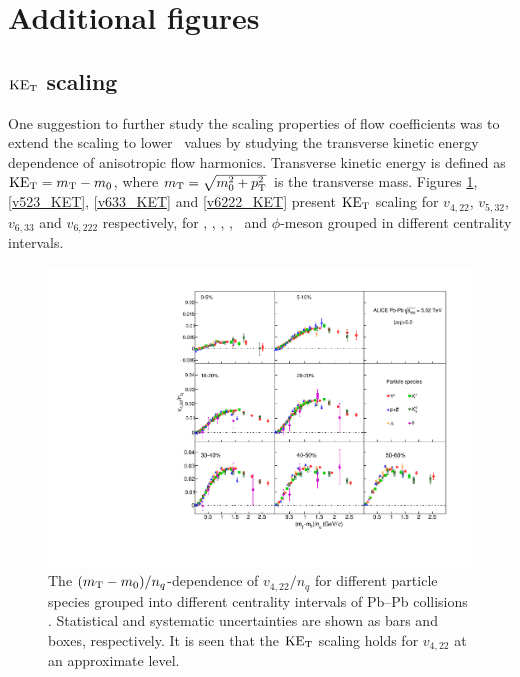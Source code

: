 \section{Additional figures}

\subsection{$\rm{KE_{T}}$ scaling}
\label{Subsubsection:KETscaling}

One suggestion to further study the scaling properties of flow coefficients was to extend the scaling to lower \pT~values by studying the transverse kinetic energy dependence of anisotropic flow harmonics. Transverse kinetic energy is defined as ${\rm KE}_{\rm{T}} = m_{\rm{T}} - m_{\rm{0}}$, where $m_{\rm{T}}= \sqrt{m_{0}^2 + p_{\rm{T}}^2}$ is the transverse mass. Figures \ref{v422_KET}, \ref{v523_KET}, \ref{v633_KET} and \ref{v6222_KET} present ${\rm KE}_{\rm{T}}$ scaling for $v_{4,22}$, $v_{5,32}$, $v_{6,33}$ and $v_{6,222}$ respectively, for \pion, \kaon, \proton, \Ks, \lambdas~and $\phi$-meson grouped in different centrality intervals.

\begin{figure}[htb]
\begin{center}
\includegraphics[scale=0.82]{figures/scaling/All_v422_gap00_KET_3by3.pdf}

\end{center}
\caption{The $(m_{\rm{T}} - m_{0})/n_{q}$-dependence of $v_{4,22}/n_{q}$ for different particle species grouped into different centrality intervals of Pb--Pb collisions \sNN. Statistical and systematic uncertainties are shown as bars and boxes, respectively. It is seen that the $\rm KE_{T}$ scaling holds for $v_{4,22}$ at an approximate level.}
\label{v422_KET}
\end{figure}

